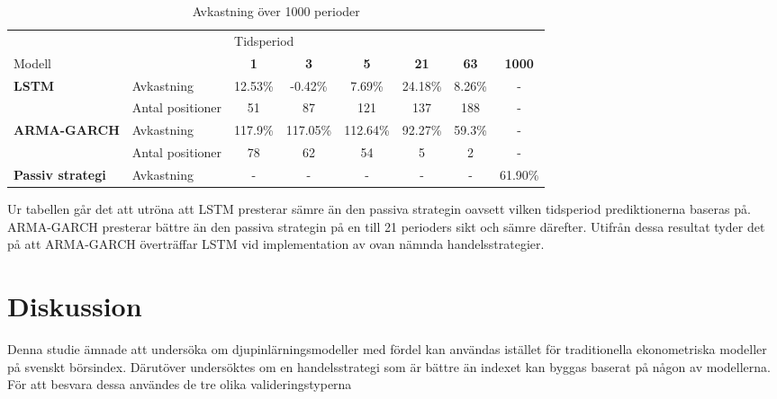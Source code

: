 \documentclass[11pt]{article}
\numberwithin{equation}{section}
\numberwithin{table}{section}
\numberwithin{figure}{section}
\begin{document}
\begin{table}[H]
\centering
\caption{Avkastning över 1000 perioder}
\begin{adjustbox}{width=1\textwidth}
\begin{tabular}{||llcccccc||}
\hline
                                     &            & \multicolumn{6}{l||}{Tidsperiod}                                  \\
Modell                                 &            & \textbf{1} & \textbf{3} & \textbf{5} & \textbf{21} & \textbf{63} & \textbf{1000}\\ \hline\hline
\multirow{2}{*}{\textbf{LSTM}}  & Avkastning       & 12.53\%          & -0.42\%         & 7.69\%          & 24.18\%           & 8.26\%  & -     \\
                                & Antal positioner & 51          & 87         & 121          & 137            & 188 &  -        \\ \cline{2-8} 
\multirow{2}{*}{\textbf{ARMA-GARCH}}  & Avkastning       & 117.9\%        & 117.05\%       & 112.64\%        & 92.27\%          & 59.3\%       & - \\
                                & Antal positioner & 78        & 62       & 54        & 5          & 2     &   -
                                \\ \cline{2-8}
{\textbf{Passiv strategi}} & Avkastning &- &- &- &- &- & 61.90\% \\ \hline
\end{tabular}
\end{adjustbox}
\end{table}

Ur tabellen går det att utröna att LSTM presterar sämre än den passiva strategin oavsett vilken tidsperiod prediktionerna baseras på. ARMA-GARCH presterar bättre än den passiva strategin på en till 21 perioders sikt och sämre därefter. Utifrån dessa resultat tyder det på att ARMA-GARCH överträffar LSTM vid implementation av ovan nämnda handelsstrategier. 

\newpage
\section{Diskussion}
Denna studie ämnade att undersöka om djupinlärningsmodeller med fördel kan användas istället för traditionella ekonometriska modeller på svenskt börsindex. Därutöver undersöktes om en handelsstrategi som är bättre än indexet kan byggas baserat på någon av modellerna. För att besvara dessa användes de tre olika valideringstyperna
\end{document}
